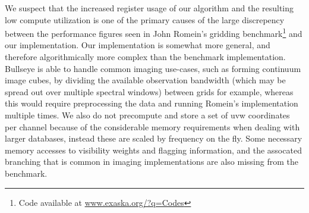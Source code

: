 We suspect that the increased register usage of our algorithm and the resulting low compute utilization is one of the primary causes
of the large discrepency between the performance figures seen in John Romein's gridding benchmark\footnote{Code available at
\url{www.exaska.org/?q=Codes}} \cite{romein2012efficient} and our implementation. Our implementation is somewhat more general, and therefore 
algorithmically more complex than the benchmark implementation. Bullseye is able to handle common imaging use-cases, such as forming continuum 
image cubes, by dividing the available observation bandwidth (which may be spread out over multiple spectral windows) between grids for example, whereas 
this would require preprocessing the data and running Romein's implementation multiple times. We also do not precompute and 
store a set of uvw coordinates per channel because of the considerable memory requirements when dealing with larger databases, 
instead these are scaled by frequency on the fly. Some necessary memory accesses to visibility weights and flagging information, and 
the assocated branching that is common in imaging implementations are also missing from the benchmark.
